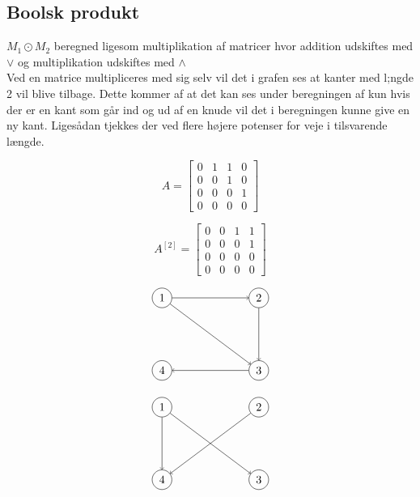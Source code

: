 \documentclass[12pt, a4paper]{article}
\begin{document}
		\subsection{Boolsk produkt}
			$M_1\odot M_2$ beregned ligesom multiplikation af matricer hvor addition udskiftes med $\lor$ og multiplikation udskiftes med $\land$\\
			Ved en matrice multipliceres med sig selv vil det i grafen ses at kanter med l;ngde 2 vil blive tilbage. Dette kommer af at det kan ses under beregningen af kun hvis der er en kant som går ind og ud af en knude vil det i beregningen kunne give en ny kant. Ligesådan tjekkes der ved flere højere potenser for veje i tilsvarende længde.\\
			\begin{minipage}{0.45\textwidth}
				$$A=\begin{bmatrix}0&1&1&0\\0&0&1&0\\0&0&0&1\\0&0&0&0\end{bmatrix}$$
			\end{minipage}
			\hfill
			\begin{minipage}{0.45\textwidth}
				$$A^{[2]}=\begin{bmatrix}0&0&1&1\\0&0&0&1\\0&0&0&0\\0&0&0&0\end{bmatrix}$$
			\end{minipage}
			\begin{minipage}{0.45\textwidth}
				$$\begin{tikzpicture}[scale=3]
						\tikzstyle{vertex}=[circle,draw=black]
						\node[vertex](v1) at (0,0.75) {1};
						\node[vertex](v2) at (1,0.75) {2};
						\node[vertex](v3) at (1,0) {3};
						\node[vertex](v4) at (0,0) {4};
						\draw[->](v1) -- (v2);
						\draw[->](v1) -- (v3);
						\draw[->](v2) -- (v3);
						\draw[->](v3) -- (v4);
					\end{tikzpicture}$$

			\end{minipage}
			\hfill
			\begin{minipage}{0.45\textwidth}
				$$\begin{tikzpicture}[scale=3]
						\tikzstyle{vertex}=[circle,draw=black]
						\node[vertex](v1) at (0,0.75) {1};
						\node[vertex](v2) at (1,0.75) {2};
						\node[vertex](v3) at (1,0) {3};
						\node[vertex](v4) at (0,0) {4};
						\draw[->](v1) -- (v3);
						\draw[->](v1) -- (v4);
						\draw[->](v2) -- (v4);
					\end{tikzpicture}$$
			\end{minipage}
\end{document}
